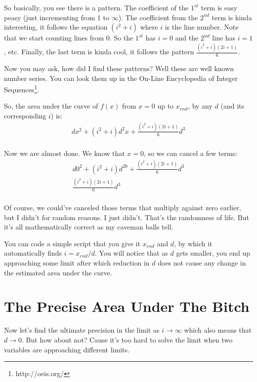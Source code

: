 \documentclass{report}
\begin{document}
So basically, you see there is a pattern. The coefficient of the $1^{st}$ term
is easy peasy (just incrementing from 1 to $\infty$). The coefficient from the
$2^{nd}$ term is kinda interesting, it follows the equation $(i^2+i)$ where $i$
is the line number. Note that we start counting lines from 0. So the $1^{st}$
has $i = 0$ and the $2^{nd}$ line has $i = 1$, etc. Finally, the last term is
kinda cool, it follows the pattern $\frac{(i^2+i)(2i+1)}{6}$.

Now you may ask, how did I find these patterns? Well these are well known
number series. You can look them up in the On-Line Encyclopedia of Integer
Sequences\footnote{http://oeis.org/}.

So, the area under the curve of $f(x)$ from $x = 0$ up to $x_{end}$, by any
$d$ (and its corresponding $i$) is:
\[\begin{split}
  dx^2  +  (i^2+i)d^2x   +  \frac{(i^2+i)(2i+1)}{6}d^3\\
\end{split}\]

Now we are almost done. We know that $x = 0$, so we can cancel a few terms:
\begin{equation}\label{eq:dick}\begin{split}
  d0^2  +  (i^2+i)d^20   +  \frac{(i^2+i)(2i+1)}{6}d^3\\
  \frac{(i^2+i)(2i+1)}{6}d^3\\
\end{split}\end{equation}

Of course, we could've canceled those terms that multiply against zero earlier,
but I didn't for random reasons. I just didn't. That's the randomness of life.
But it's all mathematically correct as my caveman balls tell.

You can code a simple script that you give it $x_{end}$ and $d$, by which it
automatically finds $i = x_{end}/d$. You will notice that as $d$ gets smaller,
you end up approaching some limit after which reduction in $d$ does not cause
any change in the estimated area under the curve.

\section{The Precise Area Under The Bitch}
Now let's find the ultimate precision in the limit as $i \rightarrow
\infty$ which also means that $d \rightarrow 0$. But how about not?
Cause it's too hard to solve the limit when two variables are
approaching different limits.
\end{document}
